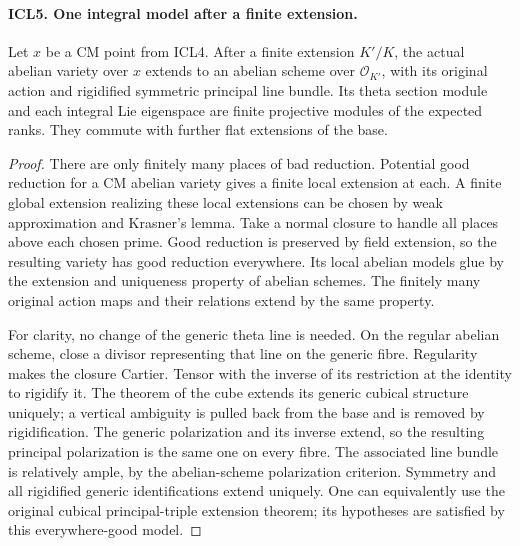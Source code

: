 \paragraph{ICL5. One integral model after a finite extension.}
\label{claim:ICL5}
Let \(x\) be a CM point from ICL4.  After a finite extension
\(K'/K\), the actual abelian variety over \(x\) extends to an
abelian scheme over \(\mathcal O_{K'}\), with its original action
and rigidified symmetric principal line bundle.  Its theta
section module and each integral Lie eigenspace are finite
projective modules of the expected ranks.  They commute with
further flat extensions of the base.
\begin{proof}
There are only finitely many places of bad reduction.  Potential
good reduction for a CM abelian variety gives a finite local
extension at each.  A finite global extension realizing these
local extensions can be chosen by weak approximation and
Krasner's lemma.  Take a normal closure to handle all places
above each chosen prime.  Good reduction is preserved by field
extension, so the resulting variety has good reduction
everywhere.  Its local abelian models glue by the extension
and uniqueness property of abelian schemes.  The finitely
many original action maps and their relations extend by the
same property.

For clarity, no change of the generic theta line is needed.
On the regular abelian scheme, close a divisor representing
that line on the generic fibre.  Regularity makes the closure
Cartier.  Tensor with the inverse of its restriction at the
identity to rigidify it.  The theorem of the cube extends its
generic cubical structure uniquely; a vertical ambiguity is
pulled back from the base and is removed by rigidification.
The generic polarization and its inverse extend, so the
resulting principal polarization is the same one on every
fibre.  The associated line bundle is relatively ample, by
the abelian-scheme polarization criterion.  Symmetry and all
rigidified generic identifications extend uniquely.  One can
equivalently use the original cubical principal-triple
extension theorem; its hypotheses are satisfied by this
everywhere-good model.


\end{proof}

